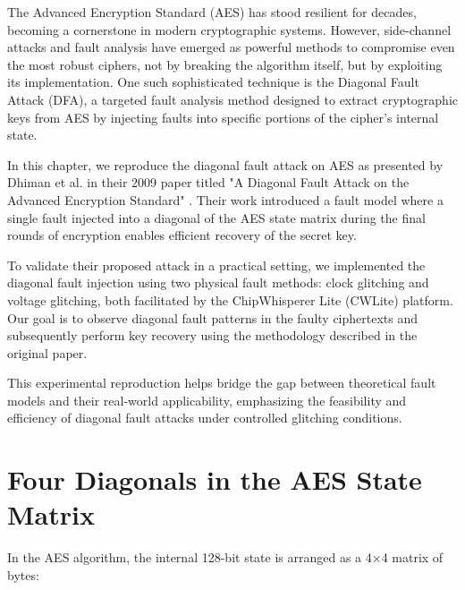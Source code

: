 
The Advanced Encryption Standard (AES) has stood resilient for decades, becoming a cornerstone in modern cryptographic systems. However, side-channel attacks and fault analysis have emerged as powerful methods to compromise even the most robust ciphers, not by breaking the algorithm itself, but by exploiting its implementation. One such sophisticated technique is the Diagonal Fault Attack (DFA), a targeted fault analysis method designed to extract cryptographic keys from AES by injecting faults into specific portions of the cipher’s internal state.

In this chapter, we reproduce the diagonal fault attack on AES as presented by Dhiman et al. in their 2009 paper titled "A Diagonal Fault Attack on the Advanced Encryption Standard" \cite{Saha2009ADF}. Their work introduced a fault model where a single fault injected into a diagonal of the AES state matrix during the final rounds of encryption enables efficient recovery of the secret key.

To validate their proposed attack in a practical setting, we implemented the diagonal fault injection using two physical fault methods: clock glitching and voltage glitching, both facilitated by the ChipWhisperer Lite (CWLite) platform. Our goal is to observe diagonal fault patterns in the faulty ciphertexts and subsequently perform key recovery using the methodology described in the original paper.

This experimental reproduction helps bridge the gap between theoretical fault models and their real-world applicability, emphasizing the feasibility and efficiency of diagonal fault attacks under controlled glitching conditions.

\section{Four Diagonals in the AES State Matrix}

In the AES algorithm, the internal 128-bit state is arranged as a 4×4 matrix of bytes:


